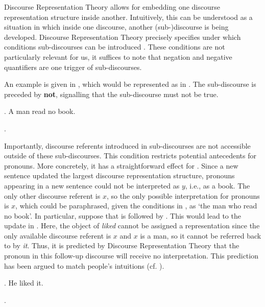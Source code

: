 \documentclass[11pt]{article} %
\begin{document}
Discourse Representation Theory allows for embedding one discourse representation structure inside another. Intuitively, this can be understood as a situation in which inside one discourse, another (sub-)discourse is being developed. Discourse Representation Theory precisely specifies under which conditions sub-discourses can be introduced \citep{kamp+93}. These conditions are not particularly relevant for us, it suffices to note that negation and negative quantifiers are one trigger of sub-discourses.

An example is given in \Next, which would be represented as in \NNext. The sub-discourse is preceded by \textbf{not}, signalling that the sub-discourse must not be true.

\ex. A man read no book.

\ex. 

Importantly, discourse referents introduced in sub-discourses are not accessible outside of these sub-discourses. This condition restricts potential antecedents for pronouns. More concretely, it has a straightforward effect for \LLast. Since a new sentence updated the largest discourse representation structure, pronouns appearing in a new sentence could not be interpreted as $y$, i.e., as a book. The only other discourse referent is $x$, so the only possible interpretation for pronouns is $x$, which could be paraphrased, given the conditions in \Last, as `the man who read no book'. In particular, suppose that \LLast is followed by \Next. This would lead to the update in \NNext. Here, the object of \textit{liked} cannot be assigned a representation since the only available discourse referent is $x$ and $x$ is a man, so it cannot be referred back to by \textit{it}. Thus, it is predicted by Discourse Representation Theory that the pronoun in this follow-up discourse will receive no interpretation. This prediction has been argued to match people's intuitions (cf. \citealt{kamp+93}).

\ex. He liked it.

\ex.  
\end{document}
